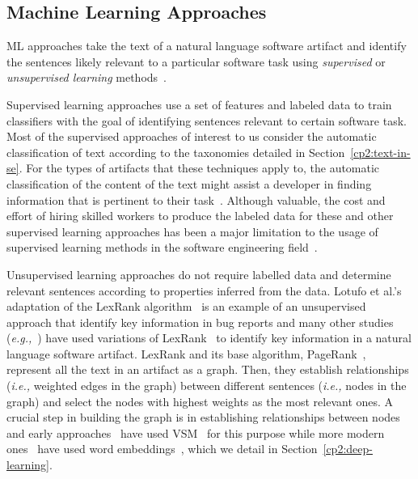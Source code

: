 \subsection{Machine Learning Approaches}
\label{cp2:machine-learning}


\acf{ML} approaches take the text of a natural language software artifact and identify 
the sentences likely relevant to a particular software task using \textit{supervised} or 
\textit{unsupervised learning} methods~\cite{zhang2005machine}.



Supervised learning approaches use a set of features and labeled data
 to train classifiers with the goal of identifying sentences relevant to 
 certain software task.
Most of the supervised approaches of interest to us  
consider the automatic classification of text according to the taxonomies 
detailed in Section~\ref{cp2:text-in-se}.
For the types of artifacts that these techniques apply to, 
the automatic classification of the 
 content of the text 
might assist a developer 
in finding information that is pertinent to their task~\cite{fucci2019, Arya2019}.
Although valuable, the cost and effort of hiring skilled workers to produce 
the labeled data for these and other supervised learning approaches
has been a major limitation 
to the usage of supervised learning 
methods in the software engineering field~\cite{Arpteg2018}.



Unsupervised learning approaches do not require labelled data and determine 
relevant sentences according to properties inferred from the data. 
Lotufo et al.'s~\cite{Lotufo2012} adaptation of the LexRank algorithm~\cite{Erkan2004} is an example of 
an unsupervised approach that identify key information in bug reports
and many other studies (\textit{e.g.,}~\cite{Jiang2017, Ponzanelli2015,  Ponzanelli2017}) have used 
variations of LexRank~\cite{Erkan2004} to identify key information in a natural
language software artifact.
LexRank and its base algorithm, PageRank~\cite{Page1999}, represent all the text in an artifact as a graph.
Then, they establish relationships (\textit{i.e.,} weighted edges in the graph) 
between different sentences (\textit{i.e.,} nodes in the graph) 
and select the nodes with highest weights as the most relevant ones.
A crucial step in building the graph is in  
establishing  relationships between nodes
and early approaches~\cite{Lotufo2012, Jiang2017} 
have used \ac{VSM}~\cite{Salton1975vsm} 
for this purpose while more modern ones~\cite{Huang2018, silva2019}
have used word embeddings~\cite{Mikolov2013, bojanowski2017FastText},
which we detail in Section~\ref{cp2:deep-learning}.




